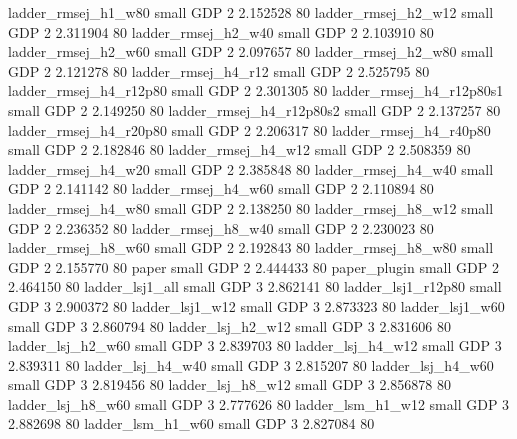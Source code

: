      ladder_rmsej_h1_w80      small      GDP                 2 2.152528 80
     ladder_rmsej_h2_w12      small      GDP                 2 2.311904 80
     ladder_rmsej_h2_w40      small      GDP                 2 2.103910 80
     ladder_rmsej_h2_w60      small      GDP                 2 2.097657 80
     ladder_rmsej_h2_w80      small      GDP                 2 2.121278 80
     ladder_rmsej_h4_r12      small      GDP                 2 2.525795 80
  ladder_rmsej_h4_r12p80      small      GDP                 2 2.301305 80
ladder_rmsej_h4_r12p80s1      small      GDP                 2 2.149250 80
ladder_rmsej_h4_r12p80s2      small      GDP                 2 2.137257 80
  ladder_rmsej_h4_r20p80      small      GDP                 2 2.206317 80
  ladder_rmsej_h4_r40p80      small      GDP                 2 2.182846 80
     ladder_rmsej_h4_w12      small      GDP                 2 2.508359 80
     ladder_rmsej_h4_w20      small      GDP                 2 2.385848 80
     ladder_rmsej_h4_w40      small      GDP                 2 2.141142 80
     ladder_rmsej_h4_w60      small      GDP                 2 2.110894 80
     ladder_rmsej_h4_w80      small      GDP                 2 2.138250 80
     ladder_rmsej_h8_w12      small      GDP                 2 2.236352 80
     ladder_rmsej_h8_w40      small      GDP                 2 2.230023 80
     ladder_rmsej_h8_w60      small      GDP                 2 2.192843 80
     ladder_rmsej_h8_w80      small      GDP                 2 2.155770 80
                   paper      small      GDP                 2 2.444433 80
            paper_plugin      small      GDP                 2 2.464150 80
         ladder_lsj1_all      small      GDP                 3 2.862141 80
      ladder_lsj1_r12p80      small      GDP                 3 2.900372 80
         ladder_lsj1_w12      small      GDP                 3 2.873323 80
         ladder_lsj1_w60      small      GDP                 3 2.860794 80
       ladder_lsj_h2_w12      small      GDP                 3 2.831606 80
       ladder_lsj_h2_w60      small      GDP                 3 2.839703 80
       ladder_lsj_h4_w12      small      GDP                 3 2.839311 80
       ladder_lsj_h4_w40      small      GDP                 3 2.815207 80
       ladder_lsj_h4_w60      small      GDP                 3 2.819456 80
       ladder_lsj_h8_w12      small      GDP                 3 2.856878 80
       ladder_lsj_h8_w60      small      GDP                 3 2.777626 80
       ladder_lsm_h1_w12      small      GDP                 3 2.882698 80
       ladder_lsm_h1_w60      small      GDP                 3 2.827084 80
